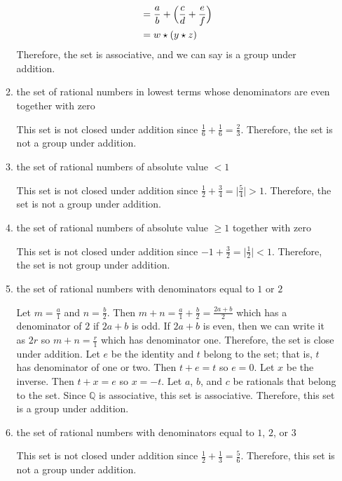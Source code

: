 \begin{enumerate}
\begin{enumerate}[label = (\alph*)]
\begin{align*}
      &= \frac{a}{b} + \Bigl(\frac{c}{d} + \frac{e}{f}\Bigr)\\
      & = w\star (y\star z)
    \end{align*}
    Therefore, the set is associative, and we can say is a group under
    addition.
  \item
    the set of rational numbers in lowest terms whose denominators are even
    together with zero
    \par\smallskip
    This set is not closed under addition since
    \(\frac{1}{6} + \frac{1}{6} = \frac{2}{3}\).
    Therefore, the set is not a group under addition.
  \item
    the set of rational numbers of absolute value \(< 1\)
    \par\smallskip
    This set is not closed under addition since
    \(\frac{1}{2} + \frac{3}{4} = \bigl\lvert\frac{5}{4}\bigr\rvert > 1\).
    Therefore, the set is not a group under addition.
  \item
    the set of rational numbers of absolute value \(\geq 1\) together with
    zero
    \par\smallskip
    This set is not closed under addition since
    \(-1 + \frac{3}{2} = \bigl\lvert\frac{1}{2}\bigr\rvert < 1\).
    Therefore, the set is not group under addition.
  \item
    the set of rational numbers with denominators equal to \(1\) or \(2\)
    \par\smallskip
    Let \(m = \frac{a}{1}\) and \(n = \frac{b}{2}\).
    Then \(m + n = \frac{a}{1} + \frac{b}{2} = \frac{2a + b}{2}\) which has
    a denominator of \(2\) if \(2a + b\) is odd.
    If \(2a + b\) is even, then we can write it as \(2r\) so
    \(m + n = \frac{r}{1}\) which has denominator one.
    Therefore, the set is close under addition.
    Let \(e\) be the identity and \(t\) belong to the set; that is, \(t\) has
    denominator of one or two.
    Then \(t + e = t\) so \(e = 0\).
    Let \(x\) be the inverse.
    Then \(t + x = e\) so \(x = -t\).
    Let \(a\), \(b\), and \(c\) be rationals that belong to the set.
    Since \(\mathbb{Q}\) is associative, this set is associative.
    Therefore, this set is a group under addition.
  \item
    the set of rational numbers with denominators equal to \(1\), \(2\), or
    \(3\)
    \par\smallskip
    This set is not closed under addition since
    \(\frac{1}{2} + \frac{1}{3} = \frac{5}{6}\).
    Therefore, this set is not a group under addition.
  \end{enumerate}

\end{enumerate}
